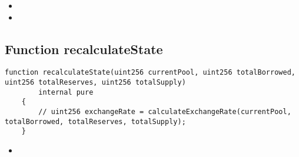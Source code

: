 \noindent\begin{itemize}
  \item {}
  \item {}
\end{itemize}


\subsection{Function recalculateState}

\begin{lstlisting}[firstnumber=20]
    function recalculateState(uint256 currentPool, uint256 totalBorrowed, uint256 totalReserves, uint256 totalSupply)
        internal pure 
    {
        // uint256 exchangeRate = calculateExchangeRate(currentPool, totalBorrowed, totalReserves, totalSupply);
    }
\end{lstlisting}

\noindent\begin{itemize}
  \item {}
\end{itemize}



